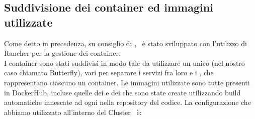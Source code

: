 \subsection{Suddivisione dei container ed immagini utilizzate}
Come detto in precedenza, su consiglio di \II, \progetto\ è stato sviluppato con l'utilizzo di Rancher per la gestione dei container.\\
I container sono stati suddivisi in modo tale da utilizzare un unico  (nel nostro caso chiamato Butterfly), vari  per separare i servizi fra loro e i , che rappresentano ciascuno un container.
Le immagini utilizzate sono tutte presenti in DockerHub, incluse quelle dei  e dei  che sono state create utilizzando build automatiche innescate ad ogni  nella repository del codice.
\newpage
La configurazione che abbiamo utilizzato all'interno del Cluster \progetto\ è:
